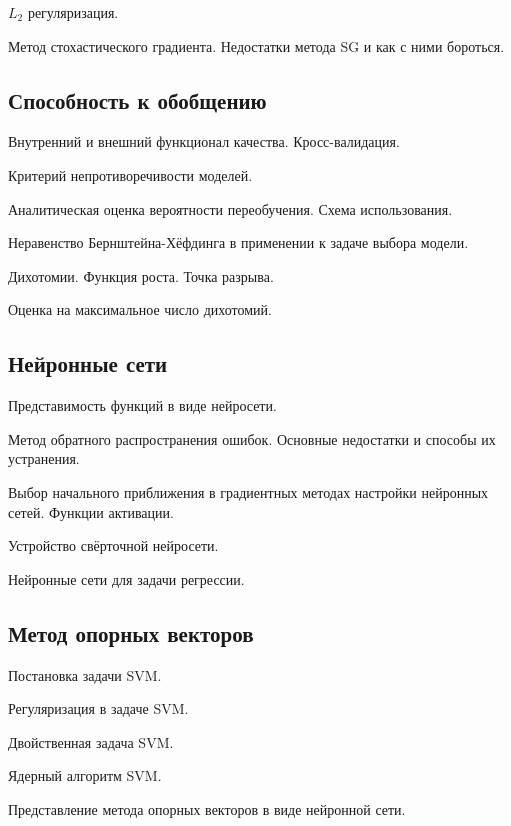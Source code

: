 \documentclass[a4paper,12pt]{article}
\begin{document}
  \myparagraph $L_2$ регуляризация.

  \myparagraph Метод стохастического градиента. Недостатки метода SG и как с ними бороться.  

  \subsection*{Способность к обобщению}
  
  \myparagraph Внутренний и внешний функционал качества. Кросс-валидация. 
  
  \myparagraph Критерий непротиворечивости моделей.

  \myparagraph Аналитическая оценка вероятности переобучения. Схема использования. 
  
  \myparagraph Неравенство Бернштейна-Хёфдинга в применении к задаче выбора модели.
  
  \myparagraph Дихотомии. Функция роста. Точка разрыва.
  
  \myparagraph Оценка на максимальное число дихотомий.
  
  \subsection*{Нейронные сети}
  
  \myparagraph Представимость функций в виде нейросети.
  
  \myparagraph Метод обратного распространения ошибок. Основные недостатки и способы их устранения.

  \myparagraph Выбор начального приближения в градиентных методах настройки нейронных сетей. Функции активации.

  \myparagraph Устройство свёрточной нейросети.
  
  \myparagraph Нейронные сети для задачи регрессии.
  
  \subsection*{Метод опорных векторов}
  
  \myparagraph Постановка задачи SVM. 
  
  \myparagraph Регуляризация в задаче SVM. 
  
  \myparagraph Двойственная задача SVM. 

  \myparagraph Ядерный алгоритм SVM. 
  
  \myparagraph Представление метода опорных векторов в виде нейронной сети.
  
\end{document}
